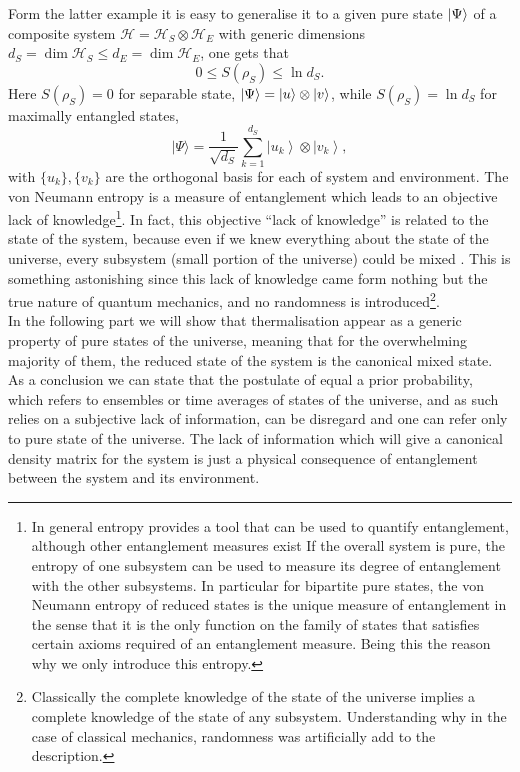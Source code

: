 \indent Form the latter example it is easy to generalise it to a given pure state $\mathinner{|{\Psi}\rangle}$ of a composite system $\mathcal{H}=\mathcal{H}_{S}\otimes\mathcal{H}_{E}$ with generic dimensions $d_S = \operatorname{dim}\mathcal{H}_{S}\leq d_E = \operatorname{dim}\mathcal{H}_E$, one gets that
\begin{equation}
0\leq S(\rho_S)\leq \ln d_S.
\label{CH1:inequality_entropy}
\end{equation}
\indent  Here $S(\rho_S)= 0$ for separable state, $\mathinner{|{\Psi}\rangle} = \mathinner{|{u}\rangle}\otimes\mathinner{|{v}\rangle}$, while $S(\rho_S)=\ln d_S$ for maximally entangled states,
\begin{equation}
|\Psi\rangle=\frac{1}{\sqrt{d_{S}}} \sum_{k=1}^{d_{S}}\left|u_{k}\right\rangle \otimes\left|v_{k}\right\rangle,
\label{CH1:spearable_state}
\end{equation}
with $\{u_k\}, \{v_k\}$ are the orthogonal basis for each of system and environment.
The von Neumann entropy is a measure of entanglement which leads to an objective lack of knowledge\footnote{In general entropy provides a tool that can be used to quantify entanglement, although other entanglement measures exist \cite{plenio_introduction_2006} If the overall system is pure, the entropy of one subsystem can be used to measure its degree of entanglement with the other subsystems. In particular for bipartite pure states, the von Neumann entropy of reduced states is the unique measure of entanglement in the sense that it is the only function on the family of states that satisfies certain axioms required of an entanglement measure. Being this the reason why we only introduce this entropy.}. In fact, this objective ``lack of knowledge'' is related to the state of the system, because even if we knew everything about the state of the universe, every subsystem (small portion of the universe) could be mixed \cite{gemmer_distribution_2003,page_average_1993}. This is something astonishing since this lack of knowledge came form nothing but the true nature of quantum mechanics, and no randomness is introduced\footnote{Classically the complete knowledge of the state of the universe implies a complete knowledge of the state of any subsystem. Understanding why in the case of classical mechanics, randomness was artificially add to the description.}.\\

\indent In the following part we will show that thermalisation appear as a generic property of pure states of the universe, meaning that for the overwhelming majority of them, the reduced state of the system is the canonical mixed state. As a conclusion we can state that the postulate of equal a prior probability, which refers to ensembles or time averages of states of the universe, and as such relies on a subjective lack of information, can be disregard and one can refer only to pure state of the universe. The lack of information which will give a canonical density matrix for the system is just a physical consequence of entanglement between the system and its environment.
